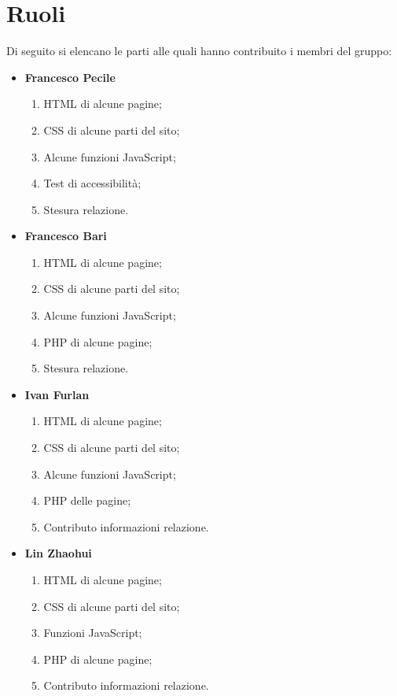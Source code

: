 \section{Ruoli}

Di seguito si elencano le parti alle quali hanno contribuito i membri del gruppo:

\begin{itemize}
\item \textbf{Francesco Pecile}
\begin{enumerate}
\item HTML di alcune pagine;
\item CSS di alcune parti del sito;
\item Alcune funzioni JavaScript;
\item Test di accessibilità;
\item Stesura relazione.
\end{enumerate}

\item \textbf{Francesco Bari}
\begin{enumerate}
\item HTML di alcune pagine;
\item CSS di alcune parti del sito;
\item Alcune funzioni JavaScript;
\item PHP di alcune pagine;
\item Stesura relazione.
\end{enumerate}

\item \textbf{Ivan Furlan}
\begin{enumerate}
\item HTML di alcune pagine;
\item CSS di alcune parti del sito;
\item Alcune funzioni JavaScript;
\item PHP delle pagine;
\item Contributo informazioni relazione.
\end{enumerate}

\item \textbf{Lin Zhaohui}
\begin{enumerate}
\item HTML di alcune pagine;
\item CSS di alcune parti del sito;
\item Funzioni JavaScript;
\item PHP di alcune pagine;
\item Contributo informazioni relazione.
\end{enumerate}
\end{itemize}